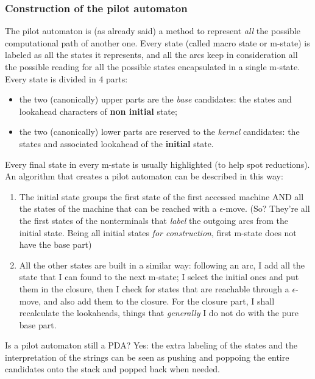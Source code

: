 			\subsubsection{Construction of the pilot automaton}
				The pilot automaton is (as already said) a method to represent \emph{all} the possible computational path of another one. Every state (called macro state or m-state) is labeled as all the states it represents, and all the arcs keep in consideration all the possible reading for all the possible states encapsulated in a single m-state.\\
				Every state is divided in 4 parts:
				\begin{itemize}
					\item the two (canonically) upper parts are the \emph{base} candidates: the states and lookahead characters of \textbf{non initial} state;
					\item the two (canonically) lower parts are reserved to the \emph{kernel} candidates: the states and associated lookahead of the \textbf{initial} state.
				\end{itemize}
				Every final state in every m-state is usually highlighted (to help spot reductions).\\
				An algorithm that creates a pilot automaton can be described in this way:
				\begin{enumerate}
					\item The initial state groups the first state of the first accessed machine AND all the states of the machine that can be reached with a $\epsilon$-move. (So? They're all the first states of the nonterminals that \emph{label} the outgoing arcs from the initial state. Being all initial states \emph{for construction}, first m-state does not have the base part)
					\item All the other states are built in a similar way: following an arc, I add all the state that I can found to the next m-state; I select the initial ones and put them in the closure, then I check for states that are reachable through a $\epsilon$-move, and also add them to the closure. For the closure part, I shall recalculate the lookaheads, things that \emph{generally} I do not do with the pure base part.
				\end{enumerate}
				Is a pilot automaton still a PDA? Yes: the extra labeling of the states and the interpretation of the strings can be seen as pushing and poppoing the entire candidates onto the stack and popped back when needed.
				
